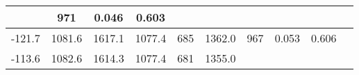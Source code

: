 \documentclass[a4paper,10pt]{article}
\begin{document}
\begin{longtable}{
     |
%    
    c|
%    
    c|
%    
    c|
%    
    c|
%    
    c|
%    
    c|
%    
    c|
%    
    c|
%    
    c|
%    
    c|
%    
    }
%        
        & 971
%        

%        

%        
        & 0.046
%        

%        

%        
        & 0.603
%        

%        
        \\
        \hline

        

%        

%        
        -121.7
%        

%        

%        
        & 1081.6
%        

%        

%        
        & 1617.1
%        

%        

%        
        & 1077.4
%        

%        

%        
        & 685
%        

%        

%        
        & 1362.0
%        

%        

%        
        & 967
%        

%        

%        
        & 0.053
%        

%        

%        
        & 0.606
%        

%        
        \\
        \hline

        

%        

%        
        -113.6
%        

%        

%        
        & 1082.6
%        

%        

%        
        & 1614.3
%        

%        

%        
        & 1077.4
%        

%        

%        
        & 681
%        

%        

%        
        & 1355.0
%        

%        


\end{longtable}
\end{document}

